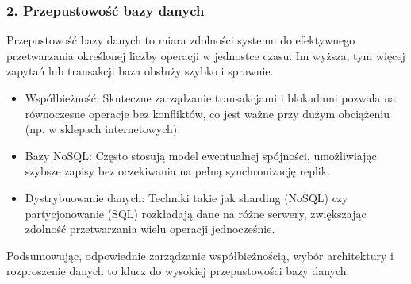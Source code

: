 \documentclass[letterpaper,10pt,polish]{sphinxmanual}
\begin{document}
\subsubsection{2. Przepustowość bazy danych}
\label{\detokenize{rozdzial2/Wydajnosc_Skalowanie_i_Replikacja/index:przepustowosc-bazy-danych}}
\sphinxAtStartPar
Przepustowość bazy danych to miara zdolności systemu do efektywnego przetwarzania określonej liczby operacji w jednostce czasu. Im wyższa, tym więcej zapytań lub transakcji baza obsłuży szybko i sprawnie.
\begin{description}
\begin{itemize}
\item {} 
\sphinxAtStartPar
Współbieżność: Skuteczne zarządzanie transakcjami i blokadami pozwala na równoczesne operacje bez konfliktów, co jest ważne przy dużym obciążeniu (np. w sklepach internetowych).

\item {} 
\sphinxAtStartPar
Bazy NoSQL: Często stosują model ewentualnej spójności, umożliwiając szybsze zapisy bez oczekiwania na pełną synchronizację replik.

\item {} 
\sphinxAtStartPar
Dystrybuowanie danych: Techniki takie jak sharding (NoSQL) czy partycjonowanie (SQL) rozkładają dane na różne serwery, zwiększając zdolność przetwarzania wielu operacji jednocześnie.

\end{itemize}

\end{description}

\sphinxAtStartPar
Podsumowując, odpowiednie zarządzanie współbieżnością, wybór architektury i rozproszenie danych to klucz do wysokiej przepustowości bazy danych.
\end{document}
